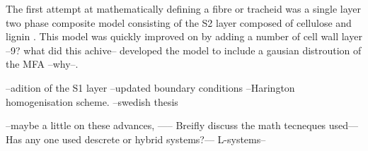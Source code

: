  The first attempt at mathematically defining a fibre or tracheid was a single layer two phase composite model consisting of the S2 layer composed of cellulose and lignin \cite{Barber_1964}. This model was quickly improved on by \cite{mark1967cell} adding a number of cell wall layer --9? what did this achive-- \cite{Cave_1968} developed the model to include a gausian distroution of the MFA --why--. 
 
 --adition of the S1 layer
 --updated boundary conditions
 --Harington homogenisation scheme. 
 --swedish thesis
 
 --maybe a little on these advances, ----- Breifly discuss the math
tecneques used---Has any one used descrete or hybrid systems?--- L-systems--